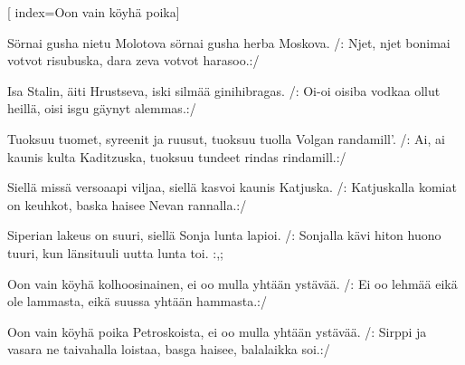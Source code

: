 [ 										
	index={Oon vain köyhä poika}]		
	
\beginverse*						
Sörnai gusha nietu Molotova
sörnai gusha herba Moskova.
/: Njet, njet bonimai votvot risubuska,
dara zeva votvot harasoo.:/
\endverse

\beginverse				
Isa Stalin, äiti Hrustseva,
iski silmää ginihibragas.
/: Oi-oi oisiba vodkaa ollut heillä,
oisi isgu gäynyt alemmas.:/
\endverse

\beginverse
Tuoksuu tuomet, syreenit ja ruusut, 
tuoksuu tuolla Volgan randamill'.
/: Ai, ai kaunis kulta Kaditzuska,
tuoksuu tundeet rindas rindamill.:/
\endverse

\beginverse
Siellä missä versoaapi viljaa, 
siellä kasvoi kaunis Katjuska.
/: Katjuskalla komiat on keuhkot,
baska haisee Nevan rannalla.:/
\endverse

\beginverse
Siperian lakeus on suuri,
siellä Sonja lunta lapioi.
/: Sonjalla kävi hiton huono tuuri,
kun länsituuli uutta lunta toi. :,;
\endverse

\beginverse
Oon vain köyhä kolhoosinainen,
ei oo mulla yhtään ystävää.
/: Ei oo lehmää eikä ole lammasta,
eikä suussa yhtään hammasta.:/
\endverse

\beginverse
Oon vain köyhä poika Petroskoista,
ei oo mulla yhtään ystävää. 
/: Sirppi ja vasara ne taivahalla loistaa,
basga haisee, balalaikka soi.:/
\endverse		
\endsong		
